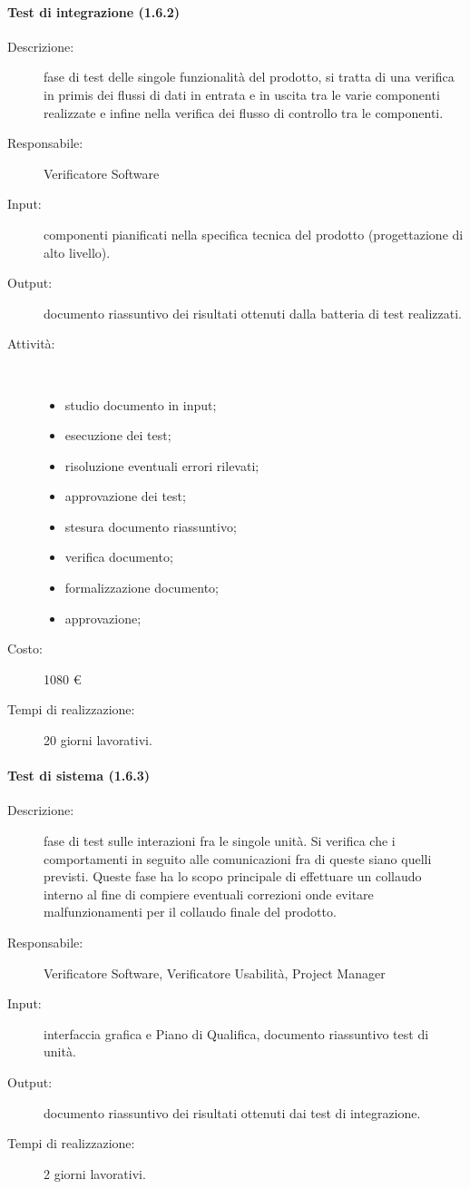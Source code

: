 \paragraph{Test di integrazione (1.6.2)}
\begin{description}
\item[Descrizione:] fase di test delle singole funzionalit\`{a} del prodotto, si tratta di una verifica in primis dei flussi di dati in entrata e in uscita tra le varie componenti realizzate e infine nella verifica dei flusso di controllo tra le componenti.
\item[Responsabile:] Verificatore Software
\item[Input:] componenti pianificati nella specifica tecnica del prodotto (progettazione di alto livello).
\item[Output:] documento riassuntivo dei risultati ottenuti dalla batteria di test realizzati.
\item[Attività:]\mbox{}\\[-1.5\baselineskip]
	\begin{itemize}
	\item studio documento in input;
	\item esecuzione dei test;
	\item risoluzione eventuali errori rilevati;
	\item approvazione dei test;
	\item stesura documento riassuntivo;
	\item verifica documento;
	\item formalizzazione documento;
	\item approvazione;
	\end{itemize}
\item[Costo:] 1080 \euro{}
\item[Tempi di realizzazione:] 20 giorni lavorativi.
\end{description}

\paragraph{Test di sistema (1.6.3)}  
\begin{description}
\item[Descrizione:] fase di test sulle interazioni fra le singole unit\`{a}. Si verifica che i comportamenti in seguito alle comunicazioni fra di queste siano quelli previsti. Queste fase ha lo scopo principale di effettuare un collaudo interno al fine di compiere eventuali correzioni onde evitare malfunzionamenti per il collaudo finale del prodotto.
\item[Responsabile:] Verificatore Software, Verificatore Usabilità, Project Manager
\item[Input:] interfaccia grafica e Piano di Qualifica, documento riassuntivo test di unit\`{a}.
\item[Output:] documento riassuntivo dei risultati ottenuti dai test di integrazione.
\item[Tempi di realizzazione:] 2 giorni lavorativi.
\end{description}


